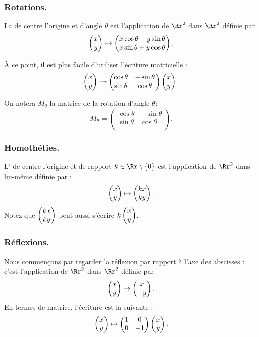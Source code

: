 \documentclass[11pt,class=report,crop=false]{standalone}
\begin{document}


\subsubsection*{Rotations.}
La  de centre l'origine et d'angle $\theta$
est l'application de $\Rr^2$ dans $\Rr^2$ définie par
$$\begin{pmatrix}x \\ y\end{pmatrix} \mapsto \begin{pmatrix}x \cos \theta - y \sin \theta \\ x\sin \theta + y \cos \theta\end{pmatrix}.$$

\`A ce point, il est plus facile d'utiliser l'écriture matricielle :
$$\begin{pmatrix}x \\ y\end{pmatrix} \mapsto \begin{pmatrix}\cos \theta & -\sin \theta \\ 
\sin\theta & \cos \theta\\ \end{pmatrix}\begin{pmatrix}x \\ y\end{pmatrix}.$$


On notera $M_\theta$ la matrice de la rotation d'angle $\theta$:
$$M_\theta = \begin{pmatrix}\cos \theta & -\sin \theta \\ 
\sin\theta & \cos \theta\\ \end{pmatrix}.$$

\subsubsection*{Homothéties.}
L' de centre l'origine et de rapport $k \in \Rr\setminus\{0\}$ est l'application 
de $\Rr^2$ dans lui-même définie par :
$$\begin{pmatrix}x \\ y\end{pmatrix} \mapsto \begin{pmatrix}kx \\ ky\end{pmatrix}.$$
Notez que $\begin{pmatrix}kx \\ ky\end{pmatrix}$ peut aussi s'écrire $k\begin{pmatrix}x \\ y\end{pmatrix}$.


\subsubsection*{Réflexions.}
Nous commençons par regarder la réflexion par rapport à l'axe des abscisses :
c'est l'application de $\Rr^2$ dans $\Rr^2$ définie par
$$\begin{pmatrix}x \\ y\end{pmatrix} \mapsto \begin{pmatrix}x \\ -y\end{pmatrix}.$$
En termes de matrice, l'écriture est la suivante :
$$\begin{pmatrix}x \\ y\end{pmatrix} \mapsto \begin{pmatrix}1 & 0 \\ 0 & -1\end{pmatrix}\begin{pmatrix}x \\ y\end{pmatrix}.$$
\end{document}
